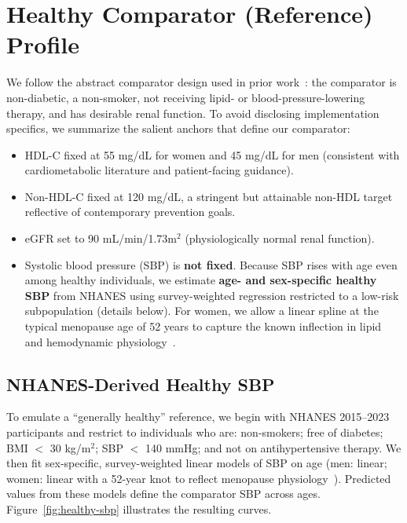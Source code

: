 \documentclass{article}
\begin{document}
\section{Healthy Comparator (Reference) Profile}
We follow the abstract comparator design used in prior work~\cite{Blaha2021JAHA}: the comparator is non-diabetic, a non-smoker, not receiving lipid- or blood-pressure-lowering therapy, and has desirable renal function. To avoid disclosing implementation specifics, we summarize the salient anchors that define our comparator:
\begin{itemize}
  \item HDL-C fixed at 55 mg/dL for women and 45 mg/dL for men (consistent with cardiometabolic literature and patient-facing guidance).
  \item Non-HDL-C fixed at 120 mg/dL, a stringent but attainable non-HDL target reflective of contemporary prevention goals.
  \item eGFR set to 90 mL/min/1.73m$^2$ (physiologically normal renal function).
  \item Systolic blood pressure (SBP) is \textbf{not fixed}. Because SBP rises with age even among healthy individuals, we estimate \textbf{age- and sex-specific healthy SBP} from NHANES using survey-weighted regression restricted to a low-risk subpopulation (details below). For women, we allow a linear spline at the typical menopause age of 52 years to capture the known inflection in lipid and hemodynamic physiology~\cite{ClevelandClinicMenopause}.
\end{itemize}

\subsection{NHANES-Derived Healthy SBP}
To emulate a ``generally healthy'' reference, we begin with NHANES 2015--2023 participants and restrict to individuals who are: non-smokers; free of diabetes; BMI $<$ 30 kg/m$^2$; SBP $<$ 140 mmHg; and not on antihypertensive therapy. We then fit sex-specific, survey-weighted linear models of SBP on age (men: linear; women: linear with a 52-year knot to reflect menopause physiology~\cite{ClevelandClinicMenopause}). Predicted values from these models define the comparator SBP across ages. Figure~\ref{fig:healthy-sbp} illustrates the resulting curves.
\end{document}
